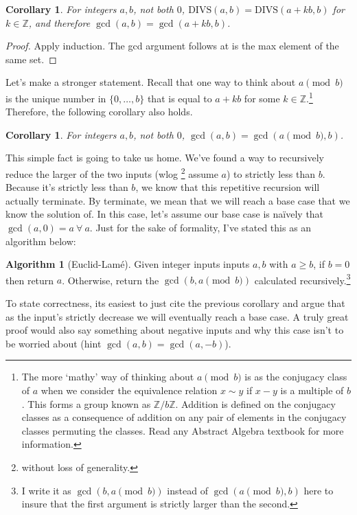 \documentclass[11pt]{article}
\theoremstyle{plain}
\newtheorem{cor}[thm]{Corollary}
\theoremstyle{definition}
\newtheorem{alg}[thm]{Algorithm}
\newcommand{\ZZ}{\mathbb{Z}}
\numberwithin{equation}{section}
\numberwithin{figure}{section}
\begin{document}
\begin{cor}
For integers $a, b$, not both $0$, $\mathrm{DIVS}(a,b) = \mathrm{DIVS}(a + kb, b)$ for $k \in \ZZ$, and therefore $\gcd(a,b) = \gcd(a + kb, b)$. 
\end{cor}

\begin{proof}
Apply induction. The gcd argument follows at is the max element of the same set.
\end{proof}

\noindent Let's make a stronger statement. Recall that one way to think about $a \pmod b$ is the unique number in $\{0, \ldots, b\}$ that is equal to $a + kb$ for some $k \in \ZZ$.\footnote{The more `mathy' way of thinking about $a \pmod b$ is as the conjugacy class of $a$ when we consider the equivalence relation $x \sim y$ if $x  - y$ is a multiple of $b$. This forms a group known as $\ZZ / b \ZZ$. Addition is defined on the conjugacy classes as a consequence of addition on any pair of elements in the conjugacy classes permuting the classes. Read any Abstract Algebra textbook for more information.} Therefore, the following corollary also holds.

\begin{cor}
For integers $a, b$, not both $0$, $\gcd(a,b) = \gcd(a \pmod b, b)$.
\end{cor}

\noindent This simple fact is going to take us home. We've found a way to recursively reduce the larger of the two inputs (wlog \footnote{without loss of generality.} assume $a$) to strictly less than $b$. Because it's strictly less than $b$, we know that this repetitive recursion will actually terminate. By terminate, we mean that we will reach a base case that we know the solution of. In this case, let's assume our base case is na\"ively that $\gcd(a,0) = a \ \forall \ a$. Just for the sake of formality, I've stated this as an algorithm below:\\

\begin{alg}[Euclid-Lam\'e]
Given integer inputs inputs $a, b$ with $a \geq b$, if $b = 0$ then return $a$. Otherwise, return the $\gcd(b, a \pmod b)$ calculated recursively.\footnote{I write it as $\gcd(b, a \pmod b)$ instead of $\gcd(a \pmod b, b)$ here to insure that the first argument is strictly larger than the second.}
\end{alg}

\noindent To state correctness, its easiest to just cite the previous corollary and argue that as the input's strictly decrease we will eventually reach a base case. A truly great proof would also say something about negative inputs and why this case isn't to be worried about (hint $\gcd(a,b) = \gcd(a, -b)$). \\
\end{document}
